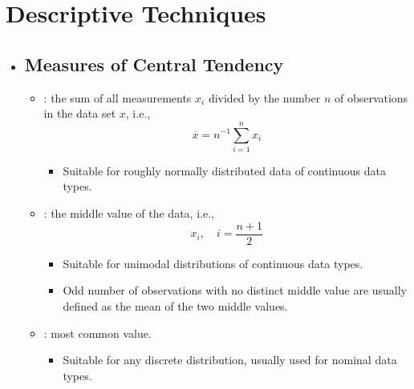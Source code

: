 \section{Descriptive Techniques}
\begin{itemize}
  \item[]

  \subsection{Measures of Central Tendency}
  \begin{itemize}
    \item {}: the sum of all measurements \(x_i\) divided by the number \(n\) of observations in the data set \(x\), i.e.,
    \[%
    \overline{x}= n ^{-1}\sum_{i=1}^{n}x_i
    \]%
    \begin{itemize}
      \item Suitable for roughly normally distributed data of continuous data types.
    \end{itemize}
    \item {}: the middle value of the data, i.e.,
    \[%
    x_i,\quad i=\frac{n+1}{2}
    \]%
    \begin{itemize}
      \item Suitable for unimodal distributions of continuous data types.
      \item Odd number of observations with no distinct middle value are usually defined as the mean of the two middle values.
    \end{itemize}
    \item {}: most common value.
      \begin{itemize}
        \item Suitable for any discrete distribution, usually used for nominal data types.
      \end{itemize}
  \end{itemize}


\end{itemize}
